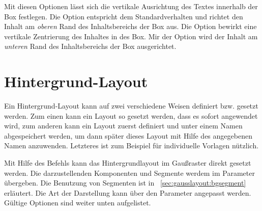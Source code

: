Mit diesen Optionen lässt sich die vertikale Ausrichtung des Textes innerhalb
der Box festlegen. Die Option  entspricht dem Standardverhalten und richtet
den Inhalt am \emph{oberen} Rand des Inhaltsbereichs der Box aus.
Die Option  bewirkt eine vertikale Zentrierung des Inhaltes in des Box.
Mir der Option  wird der Inhalt am \emph{unteren} Rand des
Inhaltsbereichs der Box ausgerichtet.




\clearpage
\section{Hintergrund-Layout}\label{sec:gausslayout:bglayout}

Ein Hintergrund-Layout kann auf zwei verschiedene Weisen definiert bzw.
gesetzt werden.
Zum einen kann ein Layout so gesetzt werden, dass es sofort angewendet wird,
zum anderen kann ein Layout zuerst definiert und unter einem Namen
abgespeichert werden, um dann später dieses Layout mit Hilfe des angegebenen 
Namen anzuwenden. Letzteres ist zum Beispiel für individuelle Vorlagen
nützlich.

\begin{Declaration}
\end{Declaration}

Mit Hilfe des Befehls  kann das Hintergrundlayout
im Gaußraster direkt gesetzt werden.
Die darzustellenden Komponenten und Segmente werdem im Parameter
 übergeben.
Die Benutzung von Segmenten ist in \chaptername~\ref{sec:gausslayout:bgsegment}
erläutert.
Die Art der Darstellung kann über den Parameter  angepasst werden.
Gültige Optionen sind weiter unten aufgelistet.

